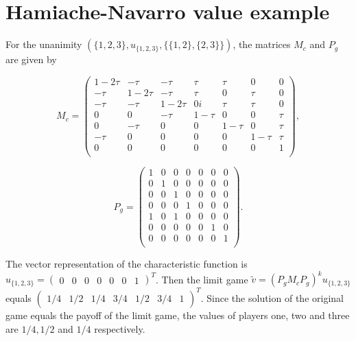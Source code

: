 \chapter{Hamiache-Navarro value example}
\label{app:HN_example}

For the unanimity $(\{1, 2, 3\}, u_{\{1, 2, 3\}}, \{\{1, 2\}, \{2, 3\}\})$, the matrices $M_c$ and $P_g$ are 
given by\cite{hamiache_associated_2020}


\begin{equation}
	M_c = \begin{pmatrix}
		1 - 2\tau & -\tau     & -\tau     & \tau     & \tau     & 0        & 0    \\
		-\tau     & 1 - 2\tau & -\tau     & \tau     & 0        & \tau     & 0    \\
		-\tau     & -\tau     & 1 - 2\tau & 0i       & \tau     & \tau     & 0    \\
		0         & 0         & -\tau     & 1 - \tau & 0        & 0        & \tau \\
		0         & -\tau     & 0         & 0        & 1 - \tau & 0        & \tau \\
		-\tau     & 0         & 0         & 0        & 0        & 1 - \tau & \tau \\
		0         & 0         & 0         & 0        & 0        & 0        & 1    \\
	\end{pmatrix},
\end{equation}


\begin{equation}
	\renewcommand{\arraystretch}{0.7}
	P_g = \begin{pmatrix}
		1 & 0 & 0 & 0 & 0 & 0 & 0 \\
		0 & 1 & 0 & 0 & 0 & 0 & 0 \\
		0 & 0 & 1 & 0 & 0 & 0 & 0 \\
		0 & 0 & 0 & 1 & 0 & 0 & 0 \\
		1 & 0 & 1 & 0 & 0 & 0 & 0 \\
		0 & 0 & 0 & 0 & 0 & 1 & 0 \\
		0 & 0 & 0 & 0 & 0 & 0 & 1 \\
	\end{pmatrix}.
\end{equation}


The vector representation of the characteristic function is $u_{\{1, 2, 3\}} = \left(\begin{smallmatrix} 0 & 0 & 0 & 0 & 0 & 0 & 1 \end{smallmatrix}\right)^T$.
Then the limit game $\tilde{v} = (P_g M_c P_g)^k u_{\{1, 2, 3\}}$ equals 
$\left(\begin{smallmatrix} 1/4 & 1/2 & 1/4 & 3/4 & 1/2 & 3/4 & 1\end{smallmatrix}\right)^T$. Since the solution  of the 
original game equals the payoff of the limit game, the values of players one, two and three are $1/4, 1/2$ and $1/4$ respectively.
